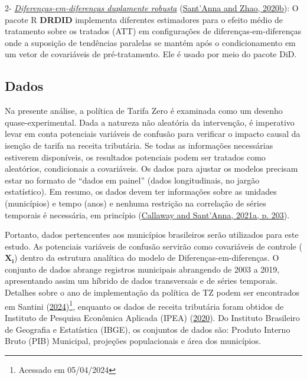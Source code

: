 \documentclass[12pt, a4paper, twoside]{article}
\numberwithin{equation}{subsection} %
\begin{document}
2- \textit{\underline{Diferenças-em-diferenças duplamente robusta}}
(\protect\hyperlink{ref-DRDID_r}{Sant'Anna and Zhao, 2020b}): O pacote R
\textbf{DRDID} implementa diferentes estimadores para o efeito médio de
tratamento sobre os tratados (ATT) em configurações de
diferenças-em-diferenças onde a suposição de tendências paralelas se
mantém após o condicionamento em um vetor de covariáveis
\hspace{0pt}\hspace{0pt}de pré-tratamento. Ele é usado por meio do
pacote DiD.

\hypertarget{sec-data}{%
\subsection{Dados}\label{sec-data}}

Na presente análise, a política de Tarifa Zero é examinada como um
desenho quase-experimental. Dada a natureza não aleatória da
intervenção, é imperativo levar em conta potenciais variáveis
\hspace{0pt}\hspace{0pt}de confusão para verificar o impacto causal da
isenção de tarifa na receita tributária. Se todas as informações
necessárias estiverem disponíveis, os resultados potenciais podem ser
tratados como aleatórios, condicionais a covariáveis. Os dados para
ajustar os modelos precisam estar no formato de ``dados em painel''
(dados longitudinais, no jargão estatístico). Em resumo, os dados devem
ter informações sobre as unidades (municípios) e tempo (anos) e nenhuma
restrição na correlação de séries temporais é necessária, em princípio
(\protect\hyperlink{ref-CALLAWAY2021200}{Callaway and Sant'Anna, 2021a,
p. 203}).

Portanto, dados pertencentes aos municípios brasileiros serão utilizados
para este estudo. As potenciais variáveis \hspace{0pt}\hspace{0pt}de
confusão servirão como covariáveis \hspace{0pt}\hspace{0pt}de controle
(\(\boldsymbol{X_i}\)) dentro da estrutura analítica do modelo de
Diferenças-em-diferenças. O conjunto de dados abrange registros
municipais abrangendo de 2003 a 2019, apresentando assim um híbrido de
dados transversais e de séries temporais. Detalhes sobre o ano de
implementação da política de TZ podem ser encontrados em Santini
(\protect\hyperlink{ref-Santini-FFPT-2024}{2024})\footnote{Acessado em
  05/04/2024}, enquanto os dados de receita tributária foram obtidos de
Instituto de Pesquisa Econômica Aplicada (IPEA)
(\protect\hyperlink{ref-IPEA-iss-2020}{2020}). Do Instituto Brasileiro
de Geografia e Estatística (IBGE), os conjuntos de dados são: Produto
Interno Bruto (PIB) Municipal, projeções populacionais e área dos
municípios.
\end{document}
